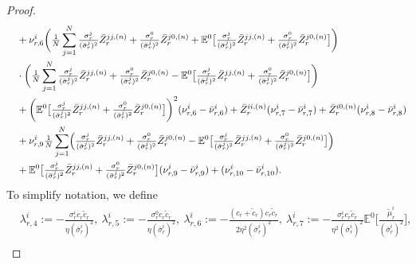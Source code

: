 \documentclass[10pt,a4paper]{article}
\theoremstyle{plain}
\theoremstyle{definition}
\numberwithin{equation}{section}
\begin{document}
\begin{proof}
\begin{align}
&\ \ \ + \nu_{r,6}^{i}\biggl(\tfrac{1}{N}\sum_{j=1}^{N}\tfrac{\sigma_{r}^{j}}{(\bar{\sigma}_{r}^{j})^{2}}\bar{Z}_{r}^{jj,(n)} + \tfrac{\sigma_{r}^{0}}{(\bar{\sigma}_{r}^{j})^{2}}\bar{Z}_{r}^{j0,(n)} + \mathbb{E}^{0}\bigl[\tfrac{\sigma_{r}^{j}}{(\bar{\sigma}_{r}^{j})^{2}}\bar{Z}_{r}^{jj,(n)}+\tfrac{\sigma_{r}^{0}}{(\bar{\sigma}_{r}^{j})^{2}}\bar{Z}_{r}^{j0,(n)}\bigr]\biggr) \nonumber \\
&\ \ \ \cdot\biggl(\tfrac{1}{N}\sum_{j=1}^{N}\tfrac{\sigma_{r}^{j}}{(\bar{\sigma}_{r}^{j})^{2}}\bar{Z}_{r}^{jj,(n)} + \tfrac{\sigma_{r}^{0}}{(\bar{\sigma}_{r}^{j})^{2}}\bar{Z}_{r}^{j0,(n)} - \mathbb{E}^{0}\bigl[\tfrac{\sigma_{r}^{j}}{(\bar{\sigma}_{r}^{j})^{2}}\bar{Z}_{r}^{jj,(n)}+\tfrac{\sigma_{r}^{0}}{(\bar{\sigma}_{r}^{j})^{2}}\bar{Z}_{r}^{j0,(n)}\bigr]\biggr) \nonumber \\
&\ \ \ + \biggl(\mathbb{E}^{0}\bigl[\tfrac{\sigma_{r}^{j}}{(\bar{\sigma}_{r}^{j})^{2}}\bar{Z}_{r}^{jj,(n)}+\tfrac{\sigma_{r}^{0}}{(\bar{\sigma}_{r}^{j})^{2}}\bar{Z}_{r}^{j0,(n)}\bigr]\biggr)^{2}(\nu_{r,6}^{i}-\bar{\nu}_{r,6}^{i}) + \bar{Z}_{r}^{ii,(n)}(\nu_{r,7}^{i}-\bar{\nu}_{r,7}^{i}) + \bar{Z}_{r}^{i0,(n)}(\nu_{r,8}^{i}-\bar{\nu}_{r,8}^{i}) \nonumber \\
&\ \ \ + \nu_{r,9}^{i}\tfrac{1}{N}\sum_{j=1}^{N}\Bigl(\tfrac{\sigma_{r}^{j}}{(\bar{\sigma}_{r}^{j})^{2}}\bar{Z}_{r}^{jj,(n)} + \tfrac{\sigma_{r}^{0}}{(\bar{\sigma}_{r}^{j})^{2}}\bar{Z}_{r}^{j0,(n)} - \mathbb{E}^{0}\bigl[\tfrac{\sigma_{r}^{j}}{(\bar{\sigma}_{r}^{j})^{2}}\bar{Z}_{r}^{jj,(n)}+\tfrac{\sigma_{r}^{0}}{(\bar{\sigma}_{r}^{j})^{2}}\bar{Z}_{r}^{j0,(n)}\bigr]\Bigr) \nonumber \\
&\ \ \ + \mathbb{E}^{0}\bigl[\tfrac{\sigma_{r}^{j}}{(\bar{\sigma}_{r}^{j})^{2}}\bar{Z}_{r}^{jj,(n)}+\tfrac{\sigma_{r}^{0}}{(\bar{\sigma}_{r}^{j})^{2}}\bar{Z}_{r}^{j0,(n)}\bigr](\nu_{r,9}^{i}-\bar{\nu}_{r,9}^{i}) + (\nu_{r,10}^{i}-\bar{\nu}_{r,10}^{i}). \nonumber 
\end{align}
To simplify notation, we define
\begin{align}
&\lambda_{r,4}^{i} := -\tfrac{\sigma_{r}^{i}c_{r}\tilde{c}_{r}}{\eta(\bar{\sigma}_{r}^{i})^{2}}, \ 
\lambda_{r,5}^{i} := -\tfrac{\sigma_{r}^{0}c_{r}\tilde{c}_{r}}{\eta(\bar{\sigma}_{r}^{i})^{2}}, \ 
\lambda_{r,6}^{i} := -\tfrac{(c_{r}+\tilde{c}_{r})c_{r}\tilde{c}_{r}}{2\eta^{2}(\bar{\sigma}_{r}^{i})^{2}}, \  
\lambda_{r,7}^{i} := -\tfrac{\sigma_{r}^{i}c_{r}\tilde{c}_{r}}{\eta^{2}(\bar{\sigma}_{r}^{i})^{2}}\mathbb{E}^{0}\bigl[\tfrac{\tilde{\mu}_{r}^{i}}{(\bar{\sigma}_{r}^{i})^{2}}\bigr],
\label{equ:def_lambda4} \\

\end{align}
\end{proof}
\end{document}
